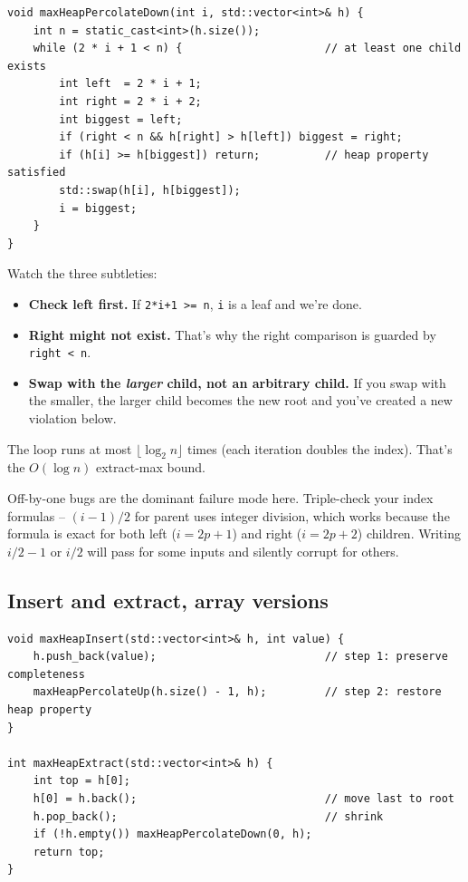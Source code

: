 \documentclass[11pt]{article}
\begin{document}
\begin{lstlisting}
void maxHeapPercolateDown(int i, std::vector<int>& h) {
    int n = static_cast<int>(h.size());
    while (2 * i + 1 < n) {                      // at least one child exists
        int left  = 2 * i + 1;
        int right = 2 * i + 2;
        int biggest = left;
        if (right < n && h[right] > h[left]) biggest = right;
        if (h[i] >= h[biggest]) return;          // heap property satisfied
        std::swap(h[i], h[biggest]);
        i = biggest;
    }
}
\end{lstlisting}

Watch the three subtleties:
\begin{itemize}[leftmargin=*]
    \item \textbf{Check left first.} If \texttt{2*i+1 >= n}, \texttt{i} is a leaf and we're done.
    \item \textbf{Right might not exist.} That's why the right comparison is guarded by \texttt{right < n}.
    \item \textbf{Swap with the \emph{larger} child, not an arbitrary child.} If you swap with the smaller, the larger child becomes the new root and you've created a new violation below.
\end{itemize}

The loop runs at most $\lfloor \log_2 n \rfloor$ times (each iteration doubles the index). That's the $O(\log n)$ extract-max bound.

\begin{warnbox}
Off-by-one bugs are the dominant failure mode here. Triple-check your index formulas -- $(i-1)/2$ for parent uses integer division, which works because the formula is exact for both left ($i = 2p+1$) and right ($i = 2p+2$) children. Writing $i/2 - 1$ or $i/2$ will pass for some inputs and silently corrupt for others.
\end{warnbox}

\subsection*{Insert and extract, array versions}

\begin{lstlisting}
void maxHeapInsert(std::vector<int>& h, int value) {
    h.push_back(value);                          // step 1: preserve completeness
    maxHeapPercolateUp(h.size() - 1, h);         // step 2: restore heap property
}

int maxHeapExtract(std::vector<int>& h) {
    int top = h[0];
    h[0] = h.back();                             // move last to root
    h.pop_back();                                // shrink
    if (!h.empty()) maxHeapPercolateDown(0, h);
    return top;
}
\end{lstlisting}
\end{document}
